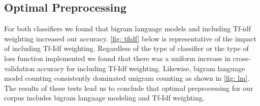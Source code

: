 \documentclass[a4paper, 12pt]{article}
\begin{document}
\subsection{Optimal Preprocessing}
For both classifiers we found that bigram language models and including Tf-idf weighting increased our accuracy. \autoref{fig: tfidf} below is representative of the impact of including Tf-Idf weighting. Regardless of the type of classifier or the type of loss function implemented we found that there was a uniform increase in cross-validation accuracy for including Tf-Idf weighting.  Likewise, bigram language model counting consistently dominated unigram counting as shown in \autoref{fig: lm}. The results of these tests lead us to conclude that optimal preprocessing for our corpus includes bigram language modeling and Tf-Idf weighting.
\end{document}
